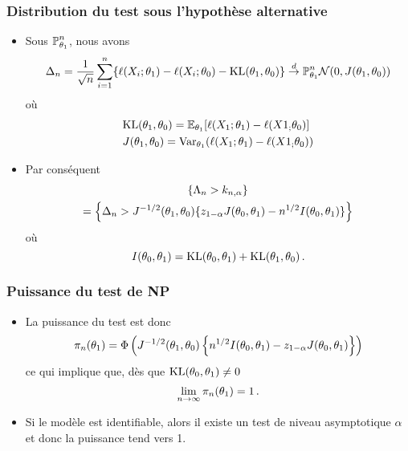 \begin{frame}
\frametitle{Distribution du test sous l'hypothèse alternative}
\begin{itemize}
\item Sous $\operatorname{{\mathbb P}}^n_{\theta_1}$, nous avons
\[
\Delta_n= \frac{1}{\sqrt{n}} \sum_{i=1}^n \{ \ell(X_i;\theta_1) - \ell(X_i;\theta_0) - \mathrm{KL}(\theta_1,\theta_0) \}
\stackrel{d}{\rightarrow}{\operatorname{{\mathbb P}}^n_{\theta_1}} \mathcal{N}( 0, J(\theta_1,\theta_0) )
\]
où 
\begin{align*}
&\mathrm{KL}(\theta_1,\theta_0)= \operatorname{{\mathbb E}}_{\theta_1}[ \ell(X_1;\theta_1) - \ell(X1_;\theta_0)]  \\
&J(\theta_1,\theta_0) = \operatorname{\mathrm{Var}}_{\theta_1} ( \ell(X_1;\theta_1) - \ell(X1_;\theta_0) )
\end{align*}
\pause \item Par conséquent
\begin{multline*}
\{ \Lambda_n > k_{n,\alpha} \} \\ 
= \left\{ \Delta_n > J^{-1/2}(\theta_1,\theta_0) \{z_{1-\alpha}J(\theta_0,\theta_1) - n^{1/2} I(\theta_0,\theta_1) \} \right\}
\end{multline*}
où 
$$
I(\theta_0,\theta_1)= \mathrm{KL}(\theta_0,\theta_1) + \mathrm{KL}(\theta_1,\theta_0) \,.
$$
\end{itemize}
\end{frame}

\begin{frame}
\frametitle{Puissance du test de NP}
\begin{itemize}
\item La puissance du test est donc
\[
\pi_n(\theta_1)= \Phi\left( J^{-1/2}(\theta_1,\theta_0) \left\{ n^{1/2} I(\theta_0,\theta_1) - z_{1-\alpha}J(\theta_0,\theta_1) \right\} \right)
\]
ce qui implique que, dès que $\mathrm{KL}(\theta_0,\theta_1) \ne 0$ 
\[
\lim_{n \to \infty} \pi_n(\theta_1)= 1 \,.
\]
\item Si le modèle est identifiable, alors il existe un test de niveau asymptotique $\alpha$ et donc la puissance tend vers 1.
\end{itemize}
\end{frame}


